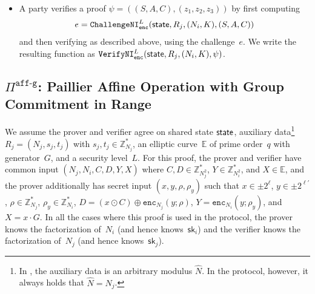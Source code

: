 \documentclass[11pt]{article}
\def\state{{\sf state}}
\newcommand{\enc}{\ensuremath{\mathtt{enc}}}
\newcommand{\sid}{\ensuremath{\mathtt{sid}}}
\newcommand{\proof}[1]{\ensuremath{\Pi^{\mathtt{#1}}}}
\newcommand{\challengeni}[1]{\ensuremath{\mathtt{ChallengeNI}_{\mathtt{#1}}}}
\newcommand{\prove}[1]{\ensuremath{\mathtt{Prove}_{\mathtt{#1}}}}
\newcommand{\verify}[1]{\ensuremath{\mathtt{Verify}_{\mathtt{#1}}}}
\newcommand{\verifyni}[1]{\ensuremath{\mathtt{VerifyNI}_{\mathtt{#1}}}}
\newcommand{\sk}{\textsf{sk}}
\newcommand{\E}{\mathbb{E}}
\newcommand{\Z}{\mathbb{Z}}
\newcommand{\?}[1]{\stackrel{?}{#1}}
\begin{document}
\begin{itemize}



    \item A party verifies a proof $\psi=((S, A, C), (z_1, z_2, z_3))$ by first computing \[e = \challengeni{enc}^{L}(\state, R_j, (N_i, K), (S, A, C))\] and then verifying as described above, using the challenge~$e$. We write the resulting function as $\verifyni{enc}^{L}(\state, R_j, (N_i, K), \psi)$.
    


\end{itemize}

\subsection{\proof{aff\mbox{-}g}: Paillier Affine Operation with Group Commitment in Range}


We assume the prover and verifier agree on shared state $\state$, auxiliary data\footnote{In \cite{cggmp21}, the auxiliary data is an arbitrary modulus $\hat N$. In the protocol, however, it always holds that $\hat N=N_j$.} $R_j = (N_j, s_j, t_j)$ with $s_j, t_j \in \Z^*_{N_j}$,
an elliptic curve~$\E$ of prime order~$q$ with generator~$G$,
and a security level~$L$.
For this proof, the prover and verifier have common input 
$(N_j, N_i, C, D, Y, X)$ 
where $C, D \in \Z^*_{N_j^2}$, 
$Y \in \Z^*_{N_i^2}$, and
$X \in \E$, and the prover additionally has secret input 
$(x, y, \rho, \rho_y)$ such that 
$x \in \pm 2^\ell$, 
$y \in \pm 2^{\ell'}$, 
$\rho \in \Z^*_{N_j}$, 
$\rho_y \in \Z^*_{N_i}$,  
$D = (x \odot C) \oplus \enc_{N_j}(y; \rho)$, 
$Y = \enc_{N_i}(y; \rho_y)$,
and $X = x \cdot G$.
In all the cases where this proof is used in the protocol, the prover knows the factorization of~$N_i$ (and hence knows~$\sk_i$) and the verifier knows the factorization of~$N_j$ (and hence knows~$\sk_j$).
\end{document}
